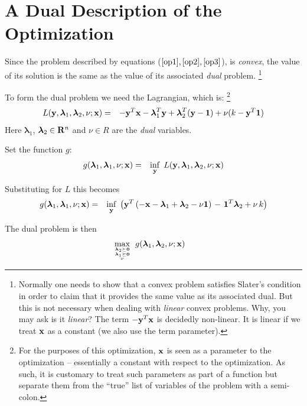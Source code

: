 \documentclass[12pt]{article}
\begin{document}
\section{A Dual Description of the Optimization}
Since the problem described by equations ($\ref{op1}, \ref{op2}, \ref{op3}$), is
{\it convex\/}, the value of its solution is the same as the value of 
its associated {\it dual\/} problem.%
\footnote{Normally one needs to show that a convex problem satisfies Slater's condition
	in order to claim that it provides the same value as its associated dual.
But this is not necessary when dealing with {\it linear\/} convex problems. 
Why, you may ask is it {\it linear\/}? The term $-{\bf y}^T {\bf x}$ is
decidedly non-linear. It is linear if we treat ${\bf x}$ as a constant (we also
use the term parameter).}

To form the dual problem we need the Lagrangian, which is:%
\footnote{For the purposes of this optimization, ${\bf x}$ is seen as a parameter
to the optimization -- essentially a constant with respect to the optimization.
As such, it is customary to treat such parameters as part of a function but separate
them from the ``true'' list of variables of the problem with a semi-colon.}
\begin{eqnarray}
	L({\bf y}, {\boldsymbol \lambda}_1, {\boldsymbol \lambda}_2, \nu; {\bf x}) &=& 
	-{\bf y}^T {\bf x} - {\boldsymbol \lambda}_1^T {\bf y} 
	+ {\boldsymbol \lambda}_2^T ({\bf y} - {\bf 1}) + \nu (k - {\bf y}^T {\bf 1}) 
\end{eqnarray}
Here ${\boldsymbol \lambda}_1$, ${\boldsymbol \lambda}_2 \in {\bf R}^n$ and $\nu \in R$
are the {\it dual\/} variables.

Set the function $g$:
\begin{eqnarray}
	g({\boldsymbol \lambda}_1, {\boldsymbol \lambda}_1, \nu; {\bf x}) &=& 
		\mathop{\rm inf}_{\bf y} 
		\; L({\bf y}, {\boldsymbol \lambda}_1, {\boldsymbol \lambda}_2, \nu; {\bf x}) 
\end{eqnarray}

Substituting for $L$ this becomes
\begin{eqnarray}
	g({\boldsymbol \lambda}_1, {\boldsymbol \lambda}_1, \nu; {\bf x}) &=& 
		\mathop{\rm inf}_{\bf y}
		\; \left({\bf y}^T \left( -{\bf x} - {\boldsymbol \lambda}_1 + {\boldsymbol \lambda}_2 - \nu {\bf 1} \right) \right.
		- \left. {\bf 1}^T {\boldsymbol \lambda}_2 + \nu \, k  \right)
\end{eqnarray}

The dual problem is then
\begin{eqnarray}
	\mathop{\rm max}_{{{\boldsymbol \lambda}_2 \succeq {\bf 0}} \atop {{{\boldsymbol \lambda}_1 \succeq {\bf 0}} \atop \nu}} 
		\; g({\boldsymbol \lambda}_1, {\boldsymbol \lambda}_2, \nu; {\bf x}) & & 
\end{eqnarray}
\end{document}
